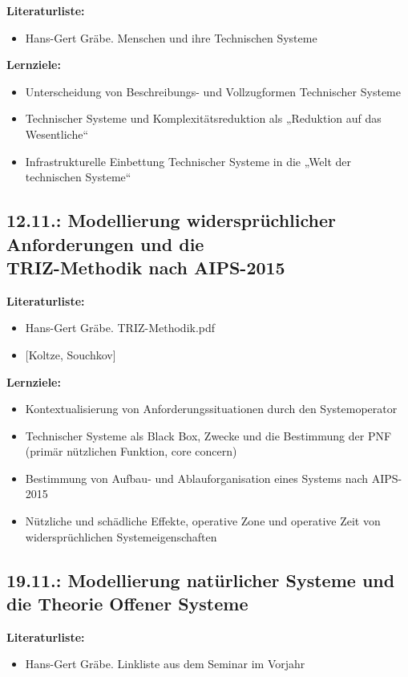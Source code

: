 \documentclass[11pt,a4paper]{article}
\begin{document}
\textbf{Literaturliste:}
\begin{itemize}[noitemsep]
\item Hans-Gert Gräbe. Menschen und ihre Technischen Systeme
\end{itemize}

\textbf{Lernziele:}
\begin{itemize}[noitemsep]
\item Unterscheidung von Beschreibungs- und Vollzugformen Technischer Systeme
\item Technischer Systeme und Komplexitätsreduktion als „Reduktion auf das Wesentliche“
\item Infrastrukturelle Einbettung Technischer Systeme in die „Welt der technischen Systeme“ 
\end{itemize}

\subsection{12.11.: Modellierung widersprüchlicher Anforderungen und die\\
  TRIZ-Methodik nach AIPS-2015}

\textbf{Literaturliste:}
\begin{itemize}[noitemsep]
\item Hans-Gert Gräbe. TRIZ-Methodik.pdf
\item {}[Koltze, Souchkov]
\end{itemize}

\textbf{Lernziele:}
\begin{itemize}[noitemsep]
\item Kontextualisierung von Anforderungssituationen durch den Systemoperator 
\item Technischer Systeme als Black Box, Zwecke und die Bestimmung der PNF (primär nützlichen
  Funktion, core concern) 
\item Bestimmung von Aufbau- und Ablauforganisation eines Systems nach
  AIPS-2015 
\item Nützliche und schädliche Effekte, operative Zone und operative Zeit von
  widersprüch\-lichen Systemeigenschaften
\end{itemize}

\subsection{19.11.: Modellierung natürlicher Systeme und die Theorie Offener
  Systeme}

\textbf{Literaturliste:}
\begin{itemize}
\item Hans-Gert Gräbe. Linkliste aus dem Seminar im Vorjahr
\end{itemize}
\end{document}
